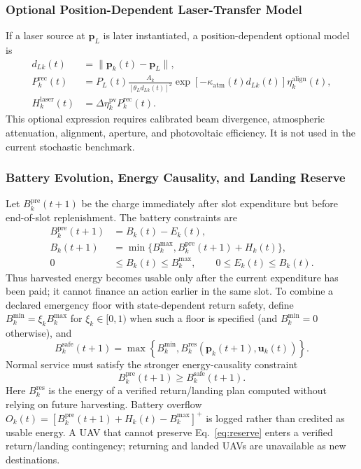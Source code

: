 \documentclass[journal]{IEEEtran}
\begin{document}
\subsubsection{Optional Position-Dependent Laser-Transfer Model}
If a laser source at $\boldsymbol p_L$ is later instantiated, a
position-dependent optional model is
\begin{equation}
\begin{aligned}
d_{Lk}(t)&=\|\boldsymbol p_k(t)-\boldsymbol p_L\|,\\
P_k^{\mathrm{rec}}(t)&=
P_L(t)\frac{A_k}{[\theta_Ld_{Lk}(t)]^2}
\exp[-\kappa_{\mathrm{atm}}(t)d_{Lk}(t)]
\eta_k^{\mathrm{align}}(t),\\
H_k^{\mathrm{laser}}(t)&=\Delta\eta_k^{\mathrm{pv}}
P_k^{\mathrm{rec}}(t).
\end{aligned}
\label{eq:optional_laser}
\end{equation}
This optional expression requires calibrated beam divergence,
atmospheric attenuation, alignment, aperture, and photovoltaic
efficiency.  It is not used in the current stochastic benchmark.

\subsubsection{Battery Evolution, Energy Causality, and Landing Reserve}
Let $B_k^{\mathrm{pre}}(t+1)$ be the charge immediately after slot
expenditure but before end-of-slot replenishment.  The battery constraints
are
\begin{equation}
\begin{aligned}
B_k^{\mathrm{pre}}(t+1)&=B_k(t)-E_k(t),\\
B_k(t+1)&=\min\{B_k^{\max},
B_k^{\mathrm{pre}}(t+1)+H_k(t)\},\\
0&\le B_k(t)\le B_k^{\max},\qquad
0\le E_k(t)\le B_k(t).
\end{aligned}
\label{eq:battery}
\end{equation}
Thus harvested energy becomes usable only after the current expenditure has
been paid; it cannot finance an action earlier in the same slot.  To combine
a declared emergency floor with state-dependent return safety, define
$B_k^{\min}=\xi_kB_k^{\max}$ for $\xi_k\in[0,1)$ when such a floor is
specified (and $B_k^{\min}=0$ otherwise), and
\[
B_k^{\mathrm{safe}}(t+1)=\max\!\left\{B_k^{\min},
B_k^{\mathrm{res}}(\boldsymbol p_k(t+1),\boldsymbol u_k(t))\right\}.
\]
Normal service must satisfy the stronger energy-causality constraint
\begin{equation}
B_k^{\mathrm{pre}}(t+1)\ge B_k^{\mathrm{safe}}(t+1).
\label{eq:reserve}
\end{equation}
Here $B_k^{\mathrm{res}}$ is the energy of a verified return/landing plan
computed without relying on future harvesting.  Battery overflow
$O_k(t)=[B_k^{\mathrm{pre}}(t+1)+H_k(t)-B_k^{\max}]^+$ is logged rather
than credited as usable energy.  A UAV that cannot preserve
Eq.~\eqref{eq:reserve} enters a verified return/landing contingency;
returning and landed UAVs are unavailable as new destinations.
\end{document}
